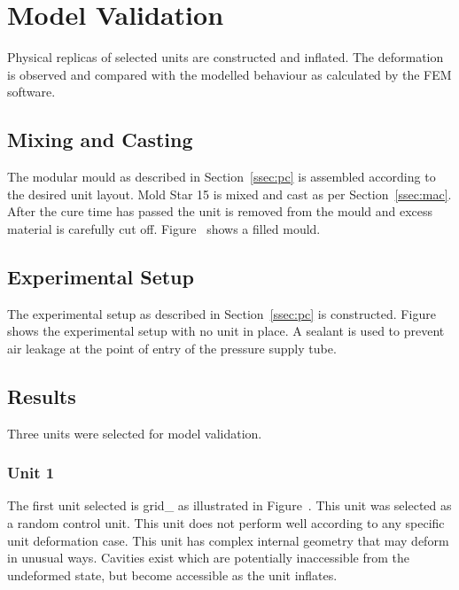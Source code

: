 \chapter{Model Validation}
\label{chp:MV}


Physical replicas of selected units are constructed and inflated. The deformation is observed and compared with the modelled behaviour as calculated by the FEM software.

\section{Mixing and Casting}

The modular mould as described in Section~\ref{ssec:pc} is assembled according to the desired unit layout. Mold Star 15 is mixed and cast as per Section~\ref{ssec:mac}. After the cure time has passed the unit is removed from the mould and excess material is carefully cut off. Figure~ shows a filled mould.

\section{Experimental Setup}

The experimental setup as described in Section~\ref{ssec:pc} is constructed. Figure~ shows the experimental setup with no unit in place. A sealant is used to prevent air leakage at the point of entry of the pressure supply tube.

\section{Results}

Three units were selected for model validation.

\subsection{Unit 1}

The first unit selected is grid\_ as illustrated in Figure~. This unit was selected as a random control unit. This unit does not perform well according to any specific unit deformation case. This unit has complex internal geometry that may deform in unusual ways. Cavities exist which are potentially inaccessible from the undeformed state, but become accessible as the unit inflates.

